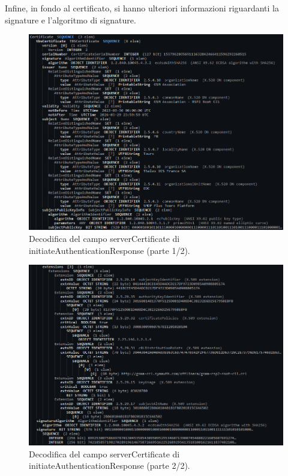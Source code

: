 \documentclass[10pt, oneside]{book}
\begin{document}
Infine, in fondo al certificato, si hanno ulteriori informazioni riguardanti la signature e l'algoritmo di signature.
\begin{figure}
\includegraphics[width=\linewidth]{decode-serverCertificate1.png}
\caption{Decodifica del campo serverCertificate di initiateAuthenticationResponse (parte 1/2).}
\label{fig:decode-serverCertificate1}
\end{figure}
\begin{figure}
\includegraphics[width=\linewidth]{decode-serverCertificate2.png}
\caption{Decodifica del campo serverCertificate di initiateAuthenticationResponse (parte 2/2).}
\label{fig:decode-serverCertificate2}
\end{figure}
\end{document}
